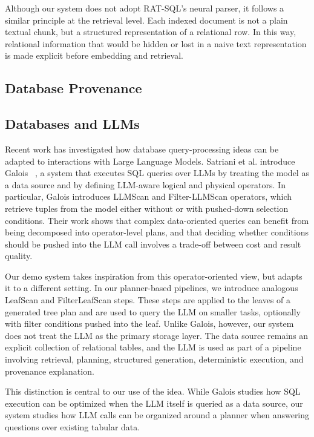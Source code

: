 \documentclass[11pt,a4paper]{article}
\begin{document}
Although our system does not adopt RAT-SQL's neural parser, it follows a similar principle at the retrieval level. Each indexed document is not a plain textual chunk, but a structured representation of a relational row. In this way, relational information that would be hidden or lost in a naive text representation is made explicit before embedding and retrieval.


\subsection{Database Provenance}

\subsection{Databases and LLMs}
Recent work has investigated how database query-processing ideas can be adapted to interactions with Large Language Models. Satriani et al. introduce Galois ~\cite{EURECOM+8182}, a system that executes SQL queries over LLMs by treating the model as a data source and by defining LLM-aware logical and physical operators. In particular, Galois introduces LLMScan and Filter-LLMScan operators, which retrieve tuples from the model either without or with pushed-down selection conditions. Their work shows that complex data-oriented queries can benefit from being decomposed into operator-level plans, and that deciding whether conditions should be pushed into the LLM call involves a trade-off between cost and result quality.

Our demo system takes inspiration from this operator-oriented view, but adapts it to a different setting. In our planner-based pipelines, we introduce analogous LeafScan and FilterLeafScan steps. These steps are applied to the leaves of a generated tree plan and are used to query the LLM on smaller tasks, optionally with filter conditions pushed into the leaf. Unlike Galois, however, our system does not treat the LLM as the primary storage layer. The data source remains an explicit collection of relational tables, and the LLM is used as part of a pipeline involving retrieval, planning, structured generation, deterministic execution, and provenance explanation.

This distinction is central to our use of the idea. While Galois studies how SQL execution can be optimized when the LLM itself is queried as a data source, our system studies how LLM calls can be organized around a planner when answering questions over existing tabular data. 
\end{document}
